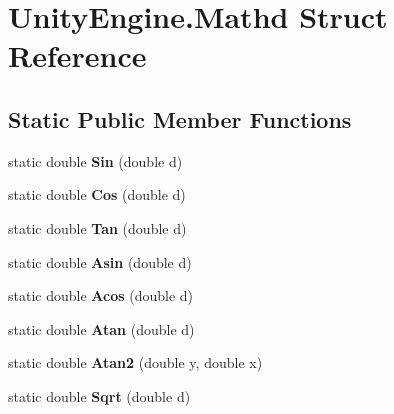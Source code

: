\hypertarget{struct_unity_engine_1_1_mathd}{}\section{Unity\+Engine.\+Mathd Struct Reference}
\label{struct_unity_engine_1_1_mathd}
\subsection*{Static Public Member Functions}
\begin{DoxyCompactItemize}
\item 
\mbox{\label{struct_unity_engine_1_1_mathd_a0b23cbb04fa0edc5dbaf0f37199999c6}} 
static double {\bfseries Sin} (double d)
\item 
\mbox{\label{struct_unity_engine_1_1_mathd_a3b6033b84f3620261fe0a093a5d634ac}} 
static double {\bfseries Cos} (double d)
\item 
\mbox{\label{struct_unity_engine_1_1_mathd_a7e4f5c67df7117389d40ddaf26bf963a}} 
static double {\bfseries Tan} (double d)
\item 
\mbox{\label{struct_unity_engine_1_1_mathd_aaff3160c6d1a2f5009428539684c7e58}} 
static double {\bfseries Asin} (double d)
\item 
\mbox{\label{struct_unity_engine_1_1_mathd_adf9655c29b2d0dc3c32b5e9ec81648f0}} 
static double {\bfseries Acos} (double d)
\item 
\mbox{\label{struct_unity_engine_1_1_mathd_a0de7adcaa412bc33e545f449176491a4}} 
static double {\bfseries Atan} (double d)
\item 
\mbox{\label{struct_unity_engine_1_1_mathd_a3e5351b317964df9b7f46335da6b1035}} 
static double {\bfseries Atan2} (double y, double x)
\item 
\mbox{\label{struct_unity_engine_1_1_mathd_a547c7c6cacb3230ea2779007996db39b}} 
static double {\bfseries Sqrt} (double d)
\item 

\end{DoxyCompactItemize}
